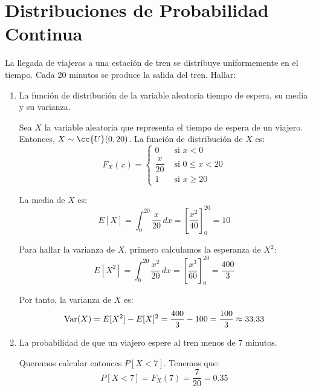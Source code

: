 \section{Distribuciones de Probabilidad Continua}

\begin{ejercicio}
    La llegada de viajeros a una estación de tren se distribuye uniformemente en el tiempo. Cada 20 minutos se produce la salida del tren. Hallar:
    \begin{enumerate}
        \item La función de distribución de la variable aleatoria tiempo de espera, su media y su varianza.
        
        Sea $X$ la variable aleatoria que representa el tiempo de espera de un viajero. Entonces, $X\sim \cc{U}(0,20)$. La función de distribución de $X$ es:
        \begin{equation*}
            F_X(x) = \left\{
                \begin{aligned}
                    0 & \text{ si } x<0\\
                    \dfrac{x}{20} & \text{ si } 0\leq x<20\\
                    1 & \text{ si } x\geq 20
                \end{aligned}
            \right.
        \end{equation*}

        La media de $X$ es:
        \begin{equation*}
            E[X] = \int_{0}^{20} \dfrac{x}{20} \, dx = \left[\dfrac{x^2}{40}\right]_{0}^{20} = 10
        \end{equation*}

        Para hallar la varianza de $X$, primero calculamos la esperanza de $X^2$:
        \begin{equation*}
            E[X^2] = \int_{0}^{20} \dfrac{x^2}{20} \, dx = \left[\dfrac{x^3}{60}\right]_{0}^{20} = \dfrac{400}{3}
        \end{equation*}

        Por tanto, la varianza de $X$ es:
        \begin{equation*}
            \operatorname{Var}(X) = E[X^2] - E[X]^2 = \dfrac{400}{3} - 100 = \dfrac{100}{3} \approx 33.33
        \end{equation*}

        \item La probabilidad de que un viajero espere al tren menos de 7 minutos.
        
        Queremos calcular entonces $P[X<7]$. Tenemos que:
        \begin{equation*}
            P[X<7] = F_X(7) = \dfrac{7}{20} = 0.35
        \end{equation*}
    \end{enumerate}
\end{ejercicio}

